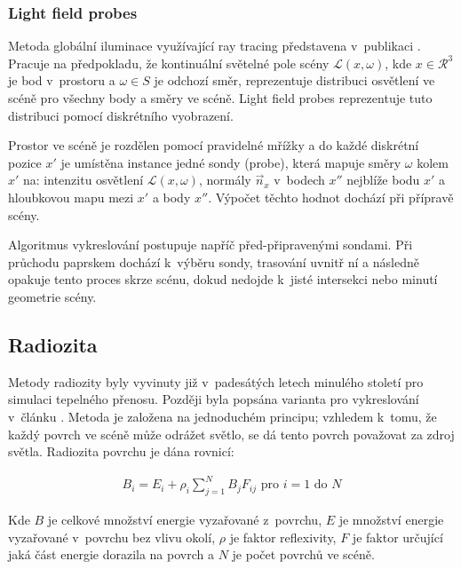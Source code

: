 \subsubsection{Light field probes} \label{sec:light_field_probes}
Metoda globální iluminace využívající ray tracing představena v~publikaci \cite{light_field_probes}. Pracuje na předpokladu, že kontinuální světelné pole scény $\mathcal{L}(x, \omega)$, kde $x \in \mathcal{R}^3$ je bod v~prostoru a $\omega \in S$ je odchozí směr, reprezentuje distribuci osvětlení ve scéně pro všechny body a směry ve scéně. Light field probes reprezentuje tuto distribuci pomocí diskrétního vyobrazení.

Prostor ve scéně je rozdělen pomocí pravidelné mřížky a do každé diskrétní pozice $x'$ je umístěna instance jedné sondy (probe), která mapuje směry $\omega$ kolem $x'$ na: intenzitu osvětlení $\mathcal{L}(x, \omega)$, normály $\vec{n}_x$ v~bodech $x''$ nejblíže bodu $x'$ a hloubkovou mapu mezi $x'$ a body $x''$. Výpočet těchto hodnot dochází při přípravě scény.

Algoritmus vykreslování postupuje napříč před-připravenými sondami. Při průchodu paprskem dochází k~výběru sondy, trasování uvnitř ní a následně opakuje tento proces skrze scénu, dokud nedojde k~jisté intersekci nebo minutí geometrie scény.

\subsection{Radiozita}
Metody radiozity byly vyvinuty již v~padesátých letech minulého století pro simulaci tepelného přenosu. Později byla popsána varianta pro vykreslování v~článku \cite{radiosity}. Metoda je založena na jednoduchém principu; vzhledem k~tomu, že každý povrch ve scéně může odrážet světlo, se dá tento povrch považovat za zdroj světla. Radiozita povrchu je dána rovnicí:


\begin{equation} \label{eq:voxel_coords}
	\begin{gathered}
		B_i = E_i + \rho_i \sum^N_{j = 1}B_jF_{ij} \text{ pro } i = 1 \text{ do } N
	\end{gathered}
\end{equation}

Kde $B$ je celkové množství energie vyzařované z~povrchu, $E$ je množství energie vyzařované v~povrchu bez vlivu okolí, $\rho$ je faktor reflexivity, $F$ je faktor určující jaká část energie dorazila na povrch a $N$ je počet povrchů ve scéně.


